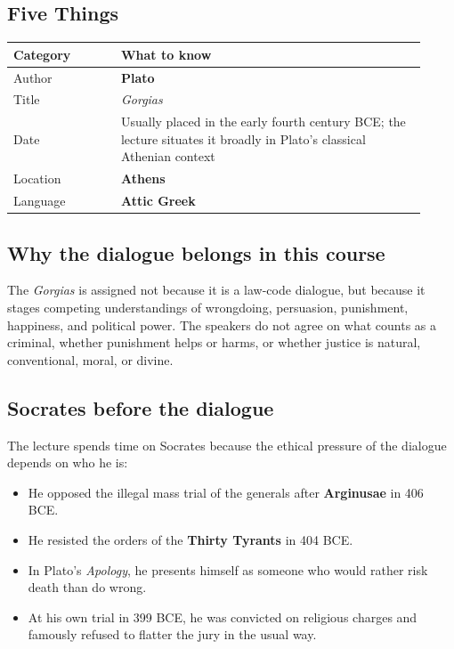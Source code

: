 \documentclass[11pt]{article}
\newcommand{\keyterm}[1]{\textbf{#1}}
\begin{document}
\subsection*{Five Things}
\begin{tabular}{@{}p{0.24\linewidth}p{0.68\linewidth}@{}}
\toprule
\textbf{Category} & \textbf{What to know} \\
\midrule
Author & \keyterm{Plato} \\
Title & \textit{Gorgias} \\
Date & Usually placed in the early fourth century BCE; the lecture situates it broadly in Plato's classical Athenian context \\
Location & \textbf{Athens} \\
Language & \textbf{Attic Greek} \\
\bottomrule
\end{tabular}

\subsection*{Why the dialogue belongs in this course}
The \textit{Gorgias} is assigned not because it is a law-code dialogue, but because it stages competing understandings of wrongdoing, persuasion, punishment, happiness, and political power. The speakers do not agree on what counts as a criminal, whether punishment helps or harms, or whether justice is natural, conventional, moral, or divine.

\subsection*{Socrates before the dialogue}
The lecture spends time on Socrates because the ethical pressure of the dialogue depends on who he is:

\begin{itemize}
\item He opposed the illegal mass trial of the generals after \keyterm{Arginusae} in 406 BCE.
\item He resisted the orders of the \keyterm{Thirty Tyrants} in 404 BCE.
\item In Plato's \textit{Apology}, he presents himself as someone who would rather risk death than do wrong.
\item At his own trial in 399 BCE, he was convicted on religious charges and famously refused to flatter the jury in the usual way.
\end{itemize}
\end{document}
